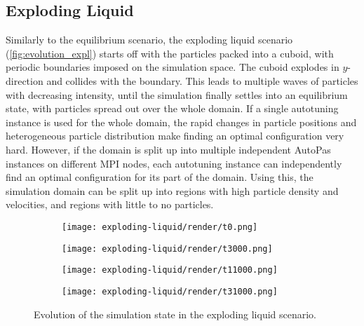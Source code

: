 \subsection{Exploding Liquid}
\label{subsec:scenario_expl}
Similarly to the equilibrium scenario, the exploding liquid scenario (\autoref{fig:evolution_expl}) starts off with the particles packed into a cuboid, with periodic boundaries imposed on the simulation space. The cuboid explodes in $y$-direction and collides with the boundary. This leads to multiple waves of particles with decreasing intensity, until the simulation finally settles into an equilibrium state, with particles spread out over the whole domain. If a single autotuning instance is used for the whole domain, the rapid changes in particle positions and heterogeneous particle distribution make finding an optimal configuration very hard. However, if the domain is split up into multiple independent AutoPas instances on different MPI nodes, each autotuning instance can independently find an optimal configuration for its part of the domain. Using this, the simulation domain can be split up into regions with high particle density and velocities, and regions with little to no particles.

\begin{figure}[htpb]
	\centering
	\begin{subfigure}[c]{.25\textwidth}
		\vspace*{-\ht\colorbarbox} %
		\texttt{[image: exploding-liquid/render/t0.png]}
	\end{subfigure}%
	\begin{subfigure}[c]{.25\textwidth}
		\texttt{[image: exploding-liquid/render/t3000.png]}
	\end{subfigure}%
	\begin{subfigure}[c]{.25\textwidth}
		\centering
		\texttt{[image: exploding-liquid/render/t11000.png]}
	\end{subfigure}%
	\begin{subfigure}[c]{.25\textwidth}
		\centering
		\texttt{[image: exploding-liquid/render/t31000.png]}
	\end{subfigure}
	\caption{Evolution of the simulation state in the exploding liquid scenario.}
	\label{fig:evolution_expl}
\end{figure}

